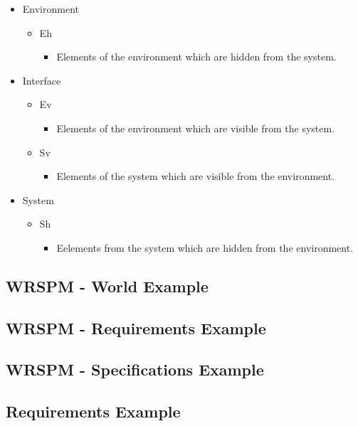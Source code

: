 \documentclass{article}
\begin{document}
    \begin{itemize}
        \item Environment
        \begin{itemize}
            \item Eh
            \begin{itemize}
                \item Elements of the environment which are hidden from the system.
            \end{itemize}
        \end{itemize}
        \item Interface
        \begin{itemize}
            \item Ev
            \begin{itemize}
                \item Elements of the environment which are visible from the system.
            \end{itemize}
            \item Sv
            \begin{itemize}
                \item Elements of the system which are visible from the environment.
            \end{itemize}
        \end{itemize}
        \item System
        \begin{itemize}
            \item Sh
            \begin{itemize}
                \item Eelements from the system which are hidden from the environment.
            \end{itemize}
        \end{itemize}
    \end{itemize}

    \subsection{WRSPM - World Example}
    \subsection{WRSPM - Requirements Example}
    \subsection{WRSPM - Specifications Example}
    \subsection{Requirements Example}
\end{document}
